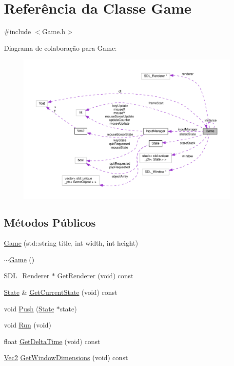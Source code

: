 \hypertarget{classGame}{\section{Referência da Classe Game}
\label{classGame}
}


{\ttfamily \#include $<$Game.\+h$>$}



Diagrama de colaboração para Game\+:\nopagebreak
\begin{figure}[H]
\begin{center}
\leavevmode
\includegraphics[width=350pt]{classGame__coll__graph}
\end{center}
\end{figure}
\subsection*{Métodos Públicos}
\begin{DoxyCompactItemize}
\item 
\hyperlink{classGame_acf1ee7a59d78a51832e8878cfca81c5a}{Game} (std\+::string title, int width, int height)
\item 
\hyperlink{classGame_ae3d112ca6e0e55150d2fdbc704474530}{$\sim$\+Game} ()
\item 
S\+D\+L\+\_\+\+Renderer $\ast$ \hyperlink{classGame_a5749c6fc2bf3c98a4dc9c11e33f96c8b}{Get\+Renderer} (void) const 
\item 
\hyperlink{classState}{State} \& \hyperlink{classGame_a1f9d6f97e969424844881dd7ad2e353e}{Get\+Current\+State} (void) const 
\item 
void \hyperlink{classGame_ab5637c16d9580f8ec08b5830baff35bd}{Push} (\hyperlink{classState}{State} $\ast$state)
\item 
void \hyperlink{classGame_a7415a437ef79fd22feb4d26f714f9c0f}{Run} (void)
\item 
float \hyperlink{classGame_aa2feacb19b45ff0ec0935ea1a6f9c9ab}{Get\+Delta\+Time} (void) const 
\item 
\hyperlink{classVec2}{Vec2} \hyperlink{classGame_adbeb87bbabcc73f936e149c2d83d9d33}{Get\+Window\+Dimensions} (void) const 
\end{DoxyCompactItemize}
